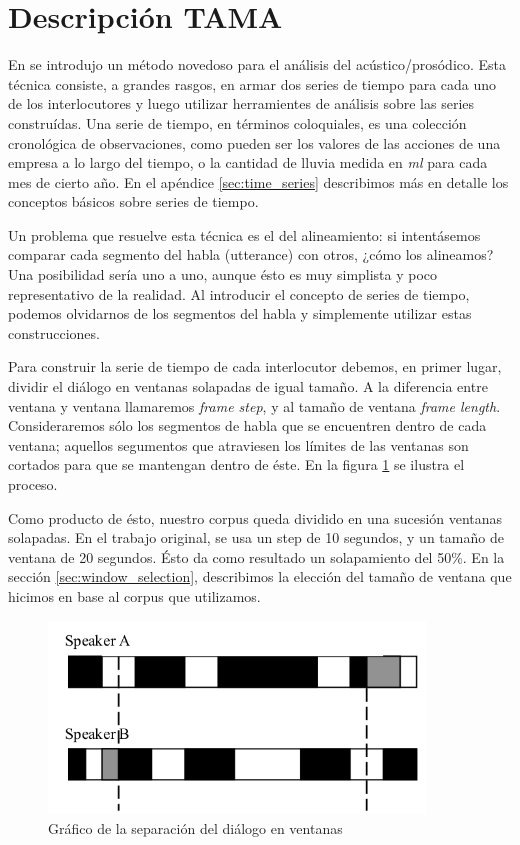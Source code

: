 \section{Descripción TAMA}
\label{sec:ant_tama}

En \cite{KOU2008} se introdujo un método novedoso para el análisis del \entrainment acústico/prosódico. Esta técnica consiste, a grandes rasgos, en armar dos series de tiempo para cada uno de los interlocutores y luego utilizar herramientes de análisis sobre las series construídas. Una serie de tiempo, en términos coloquiales, es una colección cronológica de observaciones, como pueden ser los valores de las acciones de una empresa a lo largo del tiempo, o la cantidad de lluvia medida en \emph{ml} para cada mes de cierto año. En el apéndice \ref{sec:time_series} describimos más en detalle los conceptos básicos sobre series de tiempo.

Un problema que resuelve esta técnica es el del alineamiento: si intentásemos comparar cada segmento del habla (utterance) con otros, ¿cómo los alineamos? Una posibilidad sería uno a uno, aunque ésto es muy simplista y poco representativo de la realidad. Al introducir el concepto de series de tiempo, podemos olvidarnos de los segmentos del habla y simplemente utilizar estas construcciones.

Para construir la serie de tiempo de cada interlocutor debemos, en primer lugar, dividir el diálogo en ventanas solapadas de igual tamaño. A la diferencia entre ventana y ventana llamaremos \emph{frame step}, y al tamaño de ventana \emph{frame length}. Consideraremos sólo los segmentos de habla que se encuentren dentro de cada ventana; aquellos segumentos que atraviesen los límites de las ventanas son cortados para que se mantengan dentro de éste. En la figura \ref{tama} se ilustra el proceso.

Como producto de ésto, nuestro corpus queda dividido en una sucesión ventanas solapadas. En el trabajo original, se usa un step de 10 segundos, y un tamaño de ventana de 20 segundos. Ésto da como resultado un solapamiento del 50\%. En la sección \ref{sec:window_selection}, describimos la elección del tamaño de ventana que hicimos en base al corpus que utilizamos.

\begin{figure}
\centering
\includegraphics[width=10cm]{images/tama.png}
\caption{Gráfico de la separación del diálogo en ventanas}
\label{tama}
\end{figure}

